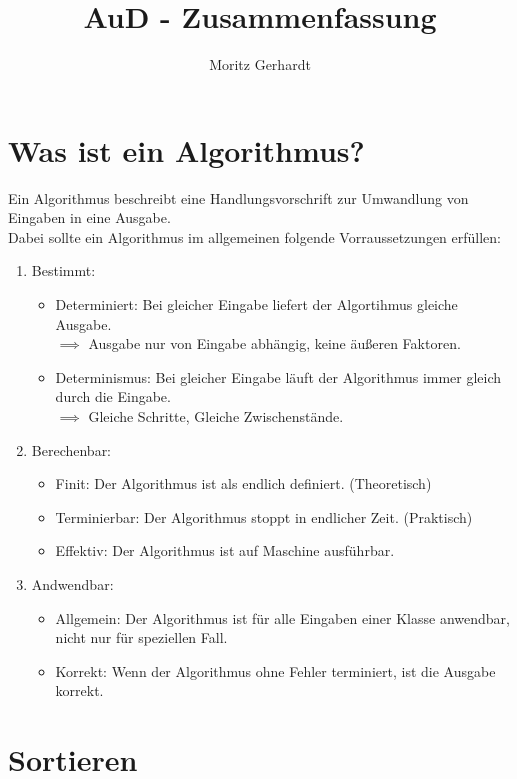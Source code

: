 \documentclass[ngerman,
color=3b,
load_common, %
boxarc,
main,
tikz,
border=3mm
]{article}
\title{AuD - Zusammenfassung} %
\author{Moritz Gerhardt } %
\date{} %
\begin{document}
\thispagestyle{fancy}
\maketitle

\tableofcontents

\newpage

\section{Was ist ein Algorithmus?}
Ein Algorithmus beschreibt eine Handlungsvorschrift zur Umwandlung von Eingaben in eine Ausgabe.\\
Dabei sollte ein Algorithmus im allgemeinen folgende Vorraussetzungen erfüllen:
\begin{enumerate}
    \item Bestimmt:
    \begin{itemize}
        \item Determiniert: Bei gleicher Eingabe liefert der Algortihmus gleiche Ausgabe. \\$\implies$ Ausgabe nur von Eingabe abhängig, keine äußeren Faktoren.
        \item Determinismus: Bei gleicher Eingabe läuft der Algorithmus immer gleich durch die Eingabe. \\$\implies$ Gleiche Schritte, Gleiche Zwischenstände.
    \end{itemize}
    \item Berechenbar:
    \begin{itemize}
        \item Finit: Der Algorithmus ist als endlich definiert. (Theoretisch)
        \item Terminierbar: Der Algorithmus stoppt in endlicher Zeit. (Praktisch)
        \item Effektiv: Der Algorithmus ist auf Maschine ausführbar.
    \end{itemize}
    \item Andwendbar:
    \begin{itemize}
        \item Allgemein: Der Algorithmus ist für alle Eingaben einer Klasse anwendbar, nicht nur für speziellen Fall.
        \item Korrekt: Wenn der Algorithmus ohne Fehler terminiert, ist die Ausgabe korrekt.
    \end{itemize}
\end{enumerate}

\section[]{Sortieren}
\end{document}
